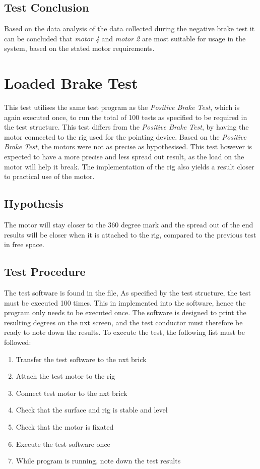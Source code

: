 \subsection{Test Conclusion}
Based on the data analysis of the data collected during the negative brake test it can be concluded that \emph{motor 4} and \emph{motor 2} are most suitable for usage in the system, based on the stated motor requirements.

\section{Loaded Brake Test}
This test utilises the same test program  as the \emph{Positive Brake Test}, which is again executed once, to run the total of 100 tests as specified to be required in the test structure. This test differs from the \emph{Positive Brake Test}, by having the motor connected to the rig used for the pointing device. Based on the \emph{Positive Brake Test}, the motors were not as precise as hypothesised. This test however is expected to have a more precise and less spread out result, as the load on the motor will help it break. The implementation of the rig also yields a result closer to practical use of the motor.

\subsection{Hypothesis} The motor will stay closer to the 360 degree mark and the spread out of the end results will be closer when it is attached to the rig, compared to the previous test in free space.

\subsection{Test Procedure}
The test software is found in the file,  As specified by the test structure, the test must be executed 100 times. This in implemented into the software, hence the program only needs to be executed once.
The software is designed to print the resulting degrees on the \gls{nxt} screen, and the test conductor must therefore be ready to note down the results. To execute the test, the following list must be followed:
\begin{enumerate}
  \item Transfer the test software to the \gls{nxt} brick
  \item Attach the test motor to the rig
  \item Connect test motor to the \gls{nxt} brick
  \item Check that the surface and rig is stable and level
  \item Check that the motor is fixated
  \item Execute the test software once
  \item While program is running, note down the test results
\end{enumerate}


